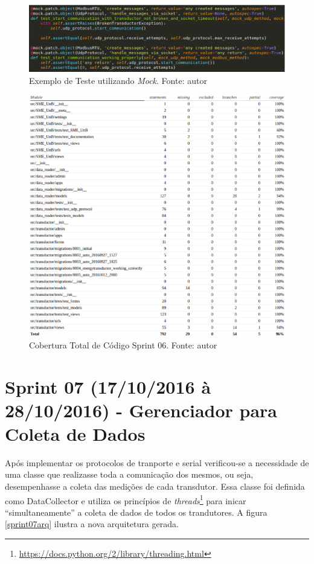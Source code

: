 \begin{figure}[!htpb]
    \centering
    \includegraphics[keepaspectratio=true,scale=0.5]{figuras/exemplo_mock.eps}
    \caption{Exemplo de Teste utilizando \textit{Mock}. Fonte: autor}
    \label{exemplo_mock}
\end{figure}

\begin{figure}[!htpb]
    \centering
    \includegraphics[keepaspectratio=true,scale=0.5]{figuras/cobertura03.eps}
    \caption{Cobertura Total de Código Sprint 06. Fonte: autor}
    \label{cobertura03}
\end{figure}

\section{Sprint 07 (17/10/2016 à 28/10/2016) - Gerenciador para Coleta de Dados}
Após implementar os protocolos de tranporte e serial verificou-se a necessidade de uma classe que realizasse toda a comunicação dos mesmos, ou seja, desempenhasse a coleta das medições de cada transdutor. Essa classe foi definida como DataCollector e utiliza os princípios de \textit{threads}\footnote{\url{https://docs.python.org/2/library/threading.html}} para inicar ``simultaneamente'' a coleta de dados de todos os trandutores. A figura \ref{sprint07arq} ilustra a nova arquitetura gerada.

